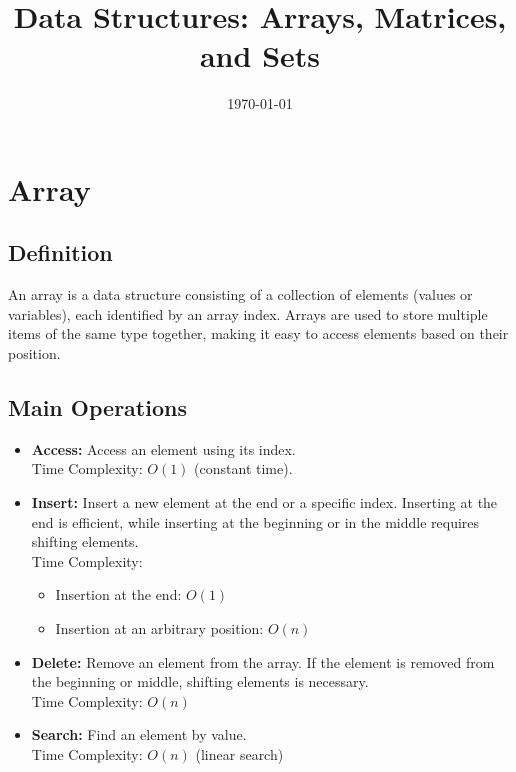 \documentclass{article}
\title{Data Structures: Arrays, Matrices, and Sets}
\author{}
\date{\today}
\begin{document}
\maketitle

\section{Array}

\subsection{Definition}
An array is a data structure consisting of a collection of elements (values or variables), each identified by an array index. Arrays are used to store multiple items of the same type together, making it easy to access elements based on their position.

\subsection{Main Operations}
\begin{itemize}
    \item \textbf{Access:} Access an element using its index.\\
    Time Complexity: $O(1)$ (constant time).
    
    \item \textbf{Insert:} Insert a new element at the end or a specific index. Inserting at the end is efficient, while inserting at the beginning or in the middle requires shifting elements.\\
    Time Complexity: 
    \begin{itemize}
        \item Insertion at the end: $O(1)$
        \item Insertion at an arbitrary position: $O(n)$
    \end{itemize}

    \item \textbf{Delete:} Remove an element from the array. If the element is removed from the beginning or middle, shifting elements is necessary.\\
    Time Complexity: $O(n)$
    
    \item \textbf{Search:} Find an element by value.\\
    Time Complexity: $O(n)$ (linear search)
\end{itemize}
\end{document}
